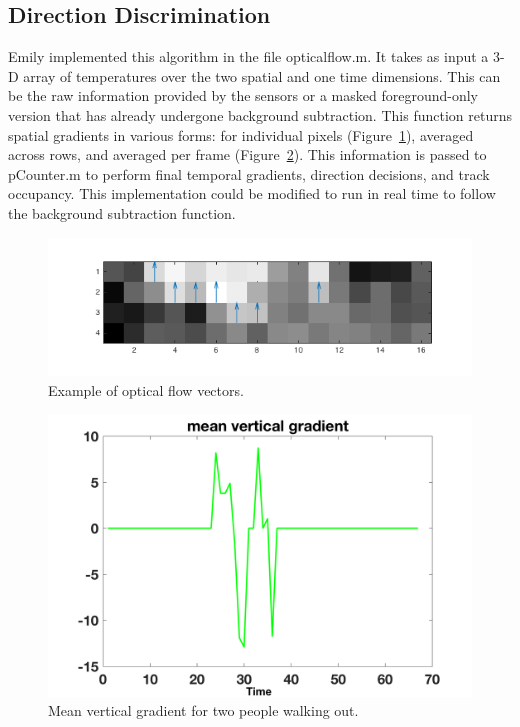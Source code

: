 \documentclass[12pt,oneside]{article} %
\begin{document}
\subsection{Direction Discrimination}
Emily implemented this algorithm in the file opticalflow.m. It takes as input a 3-D array of temperatures over the two spatial and one time dimensions. This can be the raw information provided by the sensors or a masked foreground-only version that has already undergone background subtraction. This function returns spatial gradients in various forms: for individual pixels (Figure~\ref{opflw}), averaged across rows, and averaged per frame (Figure~\ref{twoout}). This information is passed to pCounter.m to perform final temporal gradients, direction decisions, and track occupancy. This implementation could be modified to run in real time to follow the background subtraction function.
\begin{figure}[htb]
\centering
\includegraphics[scale=0.52]{images/quiver_gradients.png}
\caption{Example of optical flow vectors.}
\label{opflw}
\end{figure}
\begin{figure}[htb]
\centering
\includegraphics[scale=0.52]{images/two_out.png}
\caption{Mean vertical gradient for two people walking out.}
\label{twoout}
\end{figure}
\end{document}

